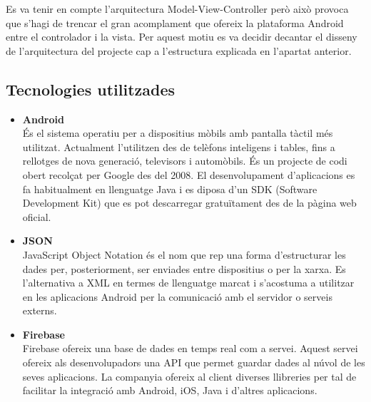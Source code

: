 Es va tenir en compte l'arquitectura Model-View-Controller però això provoca que s'hagi de trencar el gran acomplament que ofereix la plataforma Android entre el controlador i la vista. Per aquest motiu es va decidir decantar el disseny de l'arquitectura del projecte cap a l'estructura explicada en l'apartat anterior. 

\subsection{Tecnologies utilitzades}
\begin{itemize}
\item[]{\textbf{Android}}\\
És el sistema operatiu per a dispositius mòbils amb pantalla tàctil més utilitzat. Actualment l'utilitzen des de telèfons inteligens i tables, fins a rellotges de nova generació, televisors i automòbils. És un projecte de codi obert recolçat per Google des del 2008. El desenvolupament d'aplicacions es fa habitualment en llenguatge Java i es diposa d'un SDK (Software Development Kit) que es pot descarregar gratuïtament des de la pàgina web oficial.\\

\item[]{\textbf{JSON}}\\
JavaScript Object Notation és el nom que rep una forma d'estructurar les dades per, posteriorment, ser enviades entre dispositius o per la xarxa. Es l'alternativa a XML en termes de llenguatge marcat i s'acostuma a utilitzar en les aplicacions Android per la comunicació amb el servidor o serveis externs.\\

\item[]{\textbf{Firebase}}\\
Firebase ofereix una base de dades en temps real com a servei. Aquest servei ofereix als desenvolupadors una API que permet guardar dades al núvol de les seves aplicacions. La companyia ofereix al client diverses llibreries per tal de facilitar la integració amb Android, iOS, Java i d'altres aplicacions.

\end{itemize}

